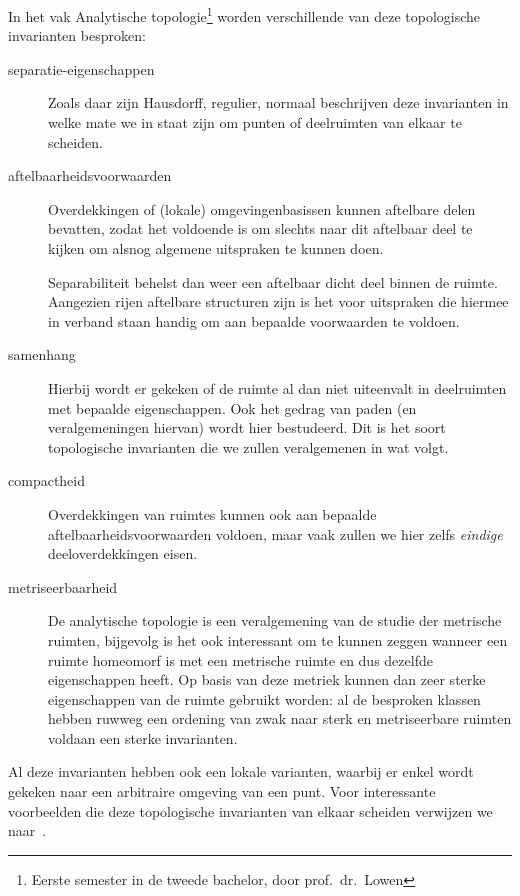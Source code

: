 \documentclass[a4paper,11pt]{article}
\begin{document}
In het vak Analytische topologie\footnote{Eerste semester in de tweede bachelor, door prof.~dr.~Lowen} worden verschillende van deze topologische invarianten besproken:
\begin{description}
  \item[separatie-eigenschappen] Zoals daar zijn Hausdorff, regulier, normaal beschrijven deze invarianten in welke mate we in staat zijn om punten of deelruimten van elkaar te scheiden. 

  \item[aftelbaarheidsvoorwaarden] Overdekkingen of (lokale) omgevingenbasissen kunnen aftelbare delen bevatten, zodat het voldoende is om slechts naar dit aftelbaar deel te kijken om alsnog algemene uitspraken te kunnen doen.
    
    Separabiliteit behelst dan weer een aftelbaar dicht deel binnen de ruimte. Aangezien rijen aftelbare structuren zijn is het voor uitspraken die hiermee in verband staan handig om aan bepaalde voorwaarden te voldoen.
    
  \item[samenhang] Hierbij wordt er gekeken of de ruimte al dan niet uiteenvalt in deelruimten met bepaalde eigenschappen. Ook het gedrag van paden (en veralgemeningen hiervan) wordt hier bestudeerd. Dit is het soort topologische invarianten die we zullen veralgemenen in wat volgt.

  \item[compactheid] Overdekkingen van ruimtes kunnen ook aan bepaalde aftelbaarheidsvoorwaarden voldoen, maar vaak zullen we hier zelfs \emph{eindige} deeloverdekkingen eisen. 

  \item[metriseerbaarheid] De analytische topologie is een veralgemening van de studie der metrische ruimten, bijgevolg is het ook interessant om te kunnen zeggen wanneer een ruimte homeomorf is met een metrische ruimte en dus dezelfde eigenschappen heeft. Op basis van deze metriek kunnen dan zeer sterke eigenschappen van de ruimte gebruikt worden: al de besproken klassen hebben ruwweg een ordening van zwak naar sterk en metriseerbare ruimten voldaan een sterke invarianten.
\end{description}

Al deze invarianten hebben ook een lokale varianten, waarbij er enkel wordt gekeken naar een arbitraire omgeving van een punt. Voor interessante voorbeelden die deze topologische invarianten van elkaar scheiden verwijzen we naar~\cite{counterexamples-in-topology}.
\vspace{1em}
\end{document}
